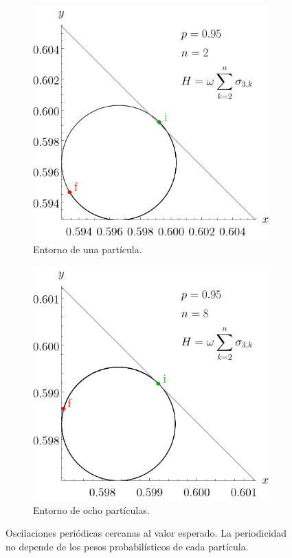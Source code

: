 \begin{figure}[ht!]
    \centering
    \begin{subfigure}{0.5\textwidth}
      \centering
      \includegraphics[width=0.9\linewidth]{chapter3/figures_separable/spheretraject_sameHam_difprob_n=2_p=0.95_both.png}
      \caption{Entorno de una partícula.}
    \end{subfigure}%
    \begin{subfigure}{0.5\textwidth}
      \centering
      \includegraphics[width=0.9\linewidth]{chapter3/figures_separable/spheretraject_sameHam_difprob_n=8_p=0.95_both.png}
      \caption{Entorno de ocho partículas.}
    \end{subfigure}
    \caption{Oscilaciones periódicas cercanas al valor esperado. La periodicidad no depende de los pesos probabilísticos de cada partícula.}\label{fig:EvolutionOscilations}
\end{figure}


